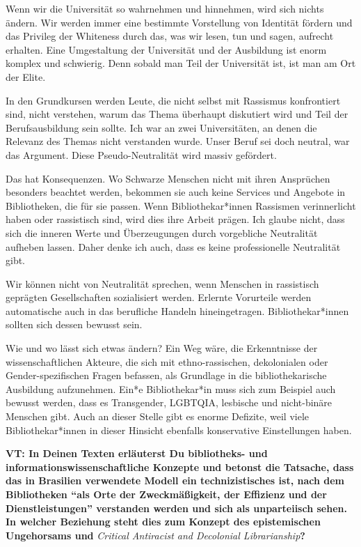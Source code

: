 \documentclass[a4paper,
fontsize=11pt,
oneside,
numbers=noperiodatend,
parskip=half-,
bibliography=totoc,
final
]{scrartcl}
\begin{document}
Wenn wir die Universität so wahrnehmen und hinnehmen, wird sich nichts
ändern. Wir werden immer eine bestimmte Vorstellung von Identität
fördern und das Privileg der Whiteness durch das, was wir lesen, tun und
sagen, aufrecht erhalten. Eine Umgestaltung der Universität und der
Ausbildung ist enorm komplex und schwierig. Denn sobald man Teil der
Universität ist, ist man am Ort der Elite.

In den Grundkursen werden Leute, die nicht selbst mit Rassismus
konfrontiert sind, nicht verstehen, warum das Thema überhaupt diskutiert
wird und Teil der Berufsausbildung sein sollte. Ich war an zwei
Universitäten, an denen die Relevanz des Themas nicht verstanden wurde.
Unser Beruf sei doch neutral, war das Argument. Diese Pseudo-Neutralität
wird massiv gefördert.

Das hat Konsequenzen. Wo Schwarze Menschen nicht mit ihren Ansprüchen
besonders beachtet werden, bekommen sie auch keine Services und Angebote
in Bibliotheken, die für sie passen. Wenn Bibliothekar*innen Rassismen
verinnerlicht haben oder rassistisch sind, wird dies ihre Arbeit prägen.
Ich glaube nicht, dass sich die inneren Werte und Überzeugungen durch
vorgebliche Neutralität aufheben lassen. Daher denke ich auch, dass es
keine professionelle Neutralität gibt.

Wir können nicht von Neutralität sprechen, wenn Menschen in rassistisch
geprägten Gesellschaften sozialisiert werden. Erlernte Vorurteile werden
automatische auch in das berufliche Handeln hineingetragen.
Bibliothekar*innen sollten sich dessen bewusst sein.

Wie und wo lässt sich etwas ändern? Ein Weg wäre, die Erkenntnisse der
wissenschaftlichen Akteure, die sich mit ethno-rassischen, dekolonialen
oder Gender-spezifischen Fragen befassen, als Grundlage in die
bibliothekarische Ausbildung aufzunehmen. Ein*e Bibliothekar*in muss
sich zum Beispiel auch bewusst werden, dass es Transgender, LGBTQIA,
lesbische und nicht-binäre Menschen gibt. Auch an dieser Stelle gibt es
enorme Defizite, weil viele Bibliothekar*innen in dieser Hinsicht
ebenfalls konservative Einstellungen haben.

\textbf{VT: In Deinen Texten erläuterst Du bibliotheks- und
informationswissenschaftliche Konzepte und betonst die Tatsache, dass
das in Brasilien verwendete Modell ein technizistisches ist, nach dem
Bibliotheken \enquote{als Orte der Zweckmäßigkeit, der Effizienz und der
Dienstleistungen} verstanden werden und sich als unparteiisch sehen. In
welcher Beziehung steht dies zum Konzept des epistemischen Ungehorsams
und} \emph{Critical Antiracist and Decolonial Librarianship}\textbf{?}
\end{document}

